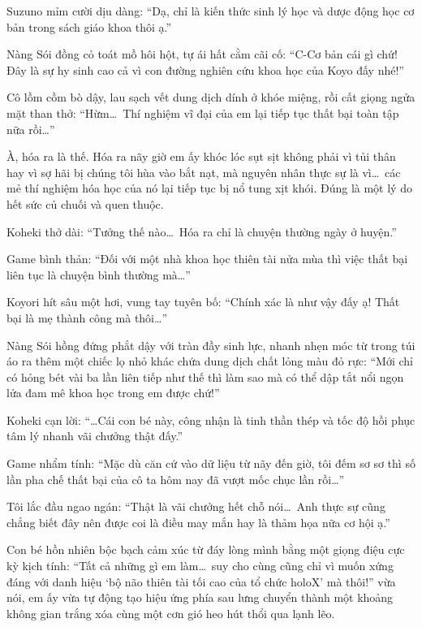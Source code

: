 \documentclass[../main.tex]{subfiles}
\begin{document}
Suzuno mỉm cười dịu dàng: ``Dạ, chỉ là kiến thức sinh lý học và dược động học cơ bản trong sách giáo khoa thôi ạ.''

Nàng Sói đồng cỏ toát mồ hôi hột, tự ái hất cằm cãi cố: ``C-Cơ bản cái gì chứ! Đây là sự hy sinh cao cả vì con đường nghiên cứu khoa học của Koyo đấy nhé!''

Cô lồm cồm bò dậy, lau sạch vết dung dịch dính ở khóe miệng, rồi cất giọng ngửa mặt than thở: ``Hừm\dots\ Thí nghiệm vĩ đại của em lại tiếp tục thất bại toàn tập nữa rồi\dots''

À, hóa ra là thế. Hóa ra nãy giờ em ấy khóc lóc sụt sịt không phải vì tủi thân hay vì sợ hãi bị chúng tôi hùa vào bắt nạt, mà nguyên nhân thực sự là vì\dots\ các mẻ thí nghiệm hóa học của nó lại tiếp tục bị nổ tung xịt khói. Đúng là một lý do hết sức củ chuối và quen thuộc.

Koheki thở dài: ``Tưởng thế nào\dots\ Hóa ra chỉ là chuyện thường ngày ở huyện.''

Game bình thản: ``Đối với một nhà khoa học thiên tài nửa mùa thì việc thất bại liên tục là chuyện bình thường mà\dots''

Koyori hít sâu một hơi, vung tay tuyên bố: ``Chính xác là như vậy đấy ạ! Thất bại là mẹ thành công mà thôi\dots''

Nàng Sói hồng đứng phắt dậy với tràn đầy sinh lực, nhanh nhẹn móc từ trong túi áo ra thêm một chiếc lọ nhỏ khác chứa dung dịch chất lỏng màu đỏ rực: ``Mới chỉ có hỏng bét vài ba lần liên tiếp như thế thì làm sao mà có thể dập tắt nổi ngọn lửa đam mê khoa học trong em được chứ!''

Koheki cạn lời: ``\dots Cái con bé này, công nhận là tinh thần thép và tốc độ hồi phục tâm lý nhanh vãi chưởng thật đấy.''

Game nhẩm tính: ``Mặc dù căn cứ vào dữ liệu từ nãy đến giờ, tôi đếm sơ sơ thì số lần pha chế thất bại của cô ta hôm nay đã vượt mốc chục lần rồi\dots''

Tôi lắc đầu ngao ngán: ``Thật là vãi chưởng hết chỗ nói\dots\ Anh thực sự cũng chẳng biết đây nên được coi là điều may mắn hay là thảm họa nữa cơ hội ạ.''

Con bé hồn nhiên bộc bạch cảm xúc từ đáy lòng mình bằng một giọng điệu cực kỳ kịch tính: ``Tất cả những gì em làm\dots\ suy cho cùng cũng chỉ vì muốn xứng đáng với danh hiệu `bộ não thiên tài tối cao của tổ chức holoX' mà thôi!'' vừa nói, em ấy vừa tự động tạo hiệu ứng phía sau lưng chuyển thành một khoảng không gian trắng xóa cùng một cơn gió heo hút thổi qua lạnh lẽo.
\end{document}
